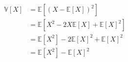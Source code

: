 \documentclass[preview]{standalone}
\begin{document}
\begin{align*}
\mathbb{V}[X] &= \mathbb{E}\left[\left(X - \mathbb{E}[X]\right)^2\right]\\&= \mathbb{E}[X^2 - 2X\mathbb{E}[X] + \mathbb{E}[X]^2]\\&= \mathbb{E}[X^2] - 2\mathbb{E}[X]^2 + \mathbb{E}[X]^2\\&= \mathbb{E}[X^2] - \mathbb{E}[X]^2
\end{align*}
\end{document}
